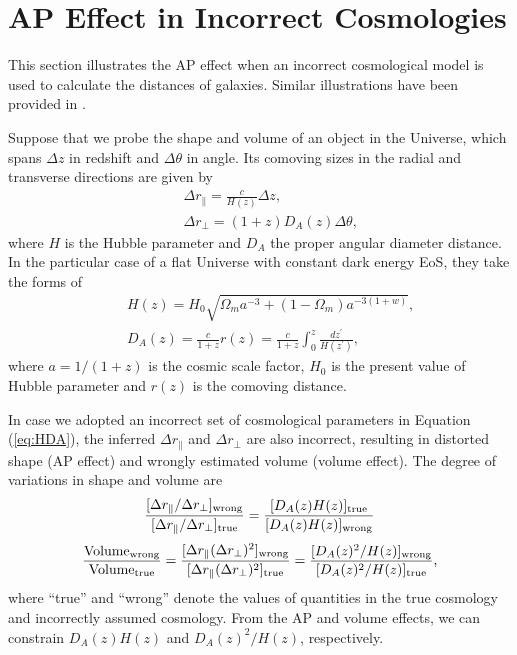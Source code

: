 \documentclass[iop]{emulateapj}
\begin{document}
\section{AP Effect in Incorrect Cosmologies}
\label{sec:APeffect}

This section illustrates the AP effect when an incorrect cosmological model is used to calculate the distances of galaxies. Similar illustrations have been provided in \cite{Li2014,Li2015}.

Suppose that we probe the shape and volume of an object in the Universe,
which spans $\Delta z$ in redshift and $\Delta \theta$ in angle.
Its comoving sizes in the radial and transverse directions are given by
\begin{eqnarray}\label{eq:distance}
& &\Delta r_{\parallel} = \frac{c}{H(z)}\Delta z,\nonumber\\
& &\Delta r_{\bot}=(1+z)D_A(z)\Delta \theta,
\end{eqnarray}
where $H$ is the Hubble parameter and $D_A$ the proper angular diameter distance.
In the particular case of a flat Universe with constant dark energy EoS, they take the forms of
\begin{eqnarray}\label{eq:HDA}
& &H(z) = H_0\sqrt{\Omega_ma^{-3}+(1-\Omega_m)a^{-3(1+w)}},\nonumber\\
& &D_A(z) = \frac{c}{1+z}r(z)=\frac{c}{1+z}\int_0^z \frac{dz^\prime}{H(z^\prime)},
\end{eqnarray}
where $a=1/(1+z)$ is the cosmic scale factor,
$H_0$ is the present value of Hubble parameter and $r(z)$ is the comoving distance.

In case we adopted an incorrect set of cosmological parameters in Equation (\ref{eq:HDA}),
the inferred $\Delta r_{\parallel}$ and $\Delta r_{\bot}$ are also incorrect,
resulting in distorted shape (AP effect) and wrongly estimated volume (volume effect).
The degree of variations in shape and volume are
\begin{equation}\label{eq:stretch}
 \frac{[\Delta r_{\parallel}/\Delta r_{\perp}]_{\rm wrong}}{[\Delta r_{\parallel}/\Delta r_{\perp}]_{\rm true}} =
  \frac{[D_A(z)H(z)]_{\rm true}}{[D_A(z)H(z)]_{\rm wrong}} 
\end{equation}
\begin{equation}\label{eq:volume}
 \frac{{\rm Volume}_{\rm wrong}}{{\rm Volume}_{\rm true}}
 = \frac{[\Delta r_{\parallel}(\Delta r_{\perp})^{2}]_{\rm wrong}}{[\Delta r_{\parallel}(\Delta r_{\perp})^{2}]_{\rm true}}
 = \frac{[D_A(z)^2/H(z)]_{\rm wrong}}{[D_A(z)^2 / H(z)]_{\rm true}},
\end{equation}
where ``true'' and ``wrong'' denote the values of quantities in the true cosmology and incorrectly assumed cosmology.
From the AP and volume effects, we can constrain  $D_A(z)H(z)$ and $D_A(z)^2 / H(z)$, respectively.
\end{document}

